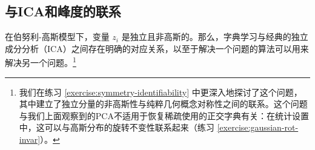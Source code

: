\documentclass[../../book-main_zh.tex]{subfiles}
\begin{document}


%
%
%
%



\subsection{与ICA和峰度的联系}
在伯努利-高斯模型下，变量 $z_i$ 是独立且非高斯的。那么，字典学习与经典的独立成分分析（ICA）之间存在明确的对应关系，以至于解决一个问题的算法可以用来解决另一个问题。\footnote{我们在练习 \ref{exercise:symmetry-identifiability} 中更深入地探讨了这个问题，其中建立了独立分量的非高斯性与纯粹几何概念对称性之间的联系。这个问题与我们上面观察到的PCA不适用于恢复稀疏使用的正交字典有关：在统计设置中，这可以与高斯分布的旋转不变性联系起来（练习 \ref{exercise:gaussian-rot-invar}）。} 
\end{document}
